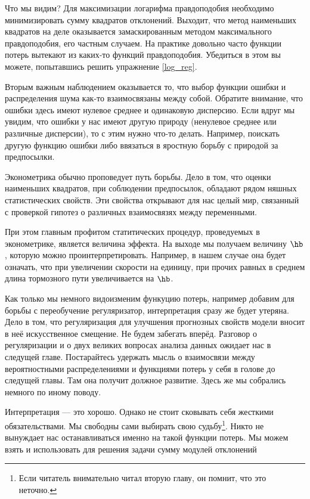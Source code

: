 Что мы видим? Для максимизации логарифма правдоподобия необходимо минимизировать сумму квадратов отклонений. Выходит, что метод наименьших квадратов на деле оказывается замаскированным методом максимального правдоподобия, его частным случаем. На практике довольно часто функции потерь вытекают из каких-то функций правдоподобия. Убедиться в этом вы можете, попытавшись решить упражнение \ref{log_reg}. 

Вторым важным наблюдением оказывается то, что выбор функции ошибки и распределения шума как-то взаимосвязаны между собой.  Обратите внимание, что ошибки здесь имеют нулевое среднее и одинаковую дисперсию. Если вдруг мы увидим, что ошибки у нас имеют другую природу (ненулевое среднее или различные дисперсии), то с этим нужно что-то делать. Например, поискать другую функцию ошибки либо ввязаться в яростную борьбу с природой за предпосылки. 

Эконометрика обычно проповедует путь борьбы. Дело в том, что оценки наименьших квадратов, при соблюдении предпосылок, обладают рядом няшных статистических свойств. Эти свойства открывают для нас целый мир, связанный с проверкой гипотез о различных взаимосвязях между переменными. 

При этом главным профитом статитических процедур, проведуемых в эконометрике,  является величина эффекта. На выходе мы получаем величину $\hb$, которую можно проинтерпретировать. Например, в нашем случае она будет означать, что при увеличении скорости на единицу, при прочих равных в среднем длина тормозного пути увеличивается на $\hb$. 

Как только мы немного видоизменим функуцию потерь, например добавим для борьбы с переобучение регуляризатор, интерпретация сразу же будет утеряна. Дело в том, что регуляризация для улучшения прогнозных свойств модели вносит в неё искусственное смещение.  Не будем забегать вперёд. Разговор о регуляризации и о двух великих вопросах анализа данных ожидает нас в следущей главе. Постарайтесь удержать  мысль о взаимосвязи между вероятностными распределениями и функциями потерь у себя в голове до следущей главы. Там она получит должное развитие. Здесь же мы собрались немного по иному поводу. 

Интерпретация --- это хорошо. Однако не стоит сковывать себя жесткими обязательствами.  Мы свободны сами выбирать свою судьбу\footnote{Если читатель внимательно читал вторую главу, он помнит, что это неточно.}. Никто не вынуждает нас останавливаться именно на такой функции потерь.  Мы можем взять и использовать для решения задачи сумму модулей отклонений

